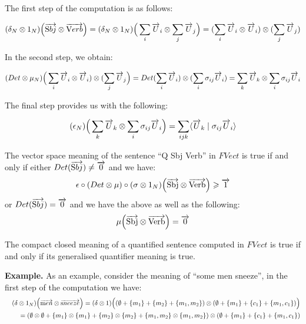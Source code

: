 The first step of the computation  is as follows:


\begin{align*}
(\delta_N \otimes 1_{N})\Big(\overrightarrow{\text Sbj} \otimes \overrightarrow{\text Verb}\Big) =   (\delta_N \otimes 1_{N})\Big(\sum_i \overrightarrow{U}_i  \otimes \sum_j \overrightarrow{U}_j \Big ) = (\sum_i \overrightarrow{U}_i \otimes \overrightarrow{U}_i) \otimes (\sum_j \overrightarrow{U}_j)
\end{align*}

\noindent
In the second step, we obtain:

\begin{align*}
(Det \otimes  \mu_N)\Big(\sum_i \overrightarrow{U}_i \otimes \overrightarrow{U}_i) \otimes (\sum_j \overrightarrow{U}_j\Big) =  Det(\sum_i \overrightarrow{U}_i) \otimes  (\sum_i \sigma_{ij} \overrightarrow{U}_i)   = \sum_k \overrightarrow{U}_k \otimes \sum_i \sigma_{ij} \overrightarrow{U}_i
\end{align*}

\noindent
The final step  provides us with the following:

\begin{align*}
(\epsilon_{N})  \Big(\sum_k \overrightarrow{U}_k \otimes \sum_i \sigma_{ij} \overrightarrow{U}_i  \Big) =  \sum_{ijk}  \langle  \overrightarrow{U}_k   \mid  \sigma_{ij} \overrightarrow{U}_i \rangle  
\end{align*}

\begin{definition}
\label{deftrue}
The vector space meaning of the sentence ``Q Sbj Verb'' in $FVect$  is true if and only if either $Det(\overrightarrow{\text Sbj}) \neq \overrightarrow{0}$ and we have: 
\[
\epsilon \circ (Det \otimes \mu) \circ (\sigma \otimes 1_N) \Big(\overrightarrow{\text{Sbj}} \otimes \overrightarrow{\text{Verb}} \Big) \geqslant \overrightarrow{1} 
\] 
or  $Det(\overrightarrow{\text Sbj}) = \overrightarrow{0}$ and we have the above as well as the following:
\[
\mu \Big(\overrightarrow{\text{Sbj}} \otimes \overrightarrow{\text{Verb}} \Big) = \overrightarrow{0}\]
\end{definition}

\begin{proposition}
The  compact closed meaning of a quantified sentence computed in $FVect$  is true if and only if  its generalised quantifier meaning is true.
\end{proposition}

\bigskip
\noindent
{\bf Example.}
As an example,  consider  the  meaning  of  ``some men sneeze'', in the first step of the computation we have:
\begin{eqnarray*}
&&(\delta \otimes 1_N) \Big(\overrightarrow{\text men} \otimes \overrightarrow{\text sneeze}\Big) = (\delta \otimes 1) \Big((\emptyset + \{m_1\} + \{m_2\} + \{m_1, m_2\}) \otimes (\emptyset + \{m_1\} + \{c_1\} + \{m_1, c_1\}) \Big)\\
&&=  (\emptyset \otimes \emptyset + \{m_1\} \otimes \{m_1\} + \{m_2\} \otimes \{m_2\} + \{m_1, m_2\} \otimes \{m_1, m_2\}) \otimes (\emptyset + \{m_1\} + \{c_1\} + \{m_1, c_1\})
\end{eqnarray*}

